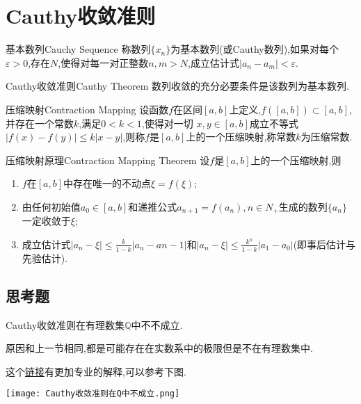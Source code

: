 \documentclass[cn,chinese,fontset]{elegantbook}
\begin{document}
    \section{Cauthy收敛准则}
        
        \begin{definition}{基本数列}{Cauchy Sequence}
            称数列$\{x_n\}$为基本数列(或Cauthy数列),如果对每个$\varepsilon>0$,存在$N$,使得对每一对正整数$n,m>N$,成立估计式$\lvert a_n-a_m\rvert<\varepsilon$.
        \end{definition}
        
        \begin{theorem}{Cauthy收敛准则}{Cauthy Theorem} 
            数列收敛的充分必要条件是该数列为基本数列.
        \end{theorem}
        
        \begin{definition}{压缩映射}{Contraction Mapping}
            设函数$f$在区间$[a,b]$上定义,$f([a,b])\subset [a,b]$,并存在一个常数$k$,满足$0<k<1$,使得对一切 $x,y\in [a,b]$成立不等式$\lvert f(x)-f(y)\rvert\leqslant k\lvert x-y\rvert$,则称$f$是$[a,b]$上的一个压缩映射,称常数$k$为压缩常数.
        \end{definition}
        \begin{theorem}{压缩映射原理}{Contraction Mapping Theorem}
            设$f$是$[a,b]$上的一个压缩映射,则
            \begin{enumerate}
                \item $f$在$[a,b]$中存在唯一的不动点$\xi=f(\xi)$;
                \item 由任何初始值$a_0\in[a,b]$和递推公式$a_{n+1}=f(a_n),n\in N_+$生成的数列$\{a_n\}$一定收敛于$\xi$;
                \item 成立估计式$\lvert a_n-\xi\rvert\leqslant\frac{k}{1-k}\lvert a_n-a{n-1}\rvert$和$\lvert a_n-\xi\rvert\leqslant\frac{k^n}{1-k}\lvert a_1-a_0\rvert$(即事后估计与先验估计).
            \end{enumerate}
        \end{theorem}
            \subsection{思考题}
            \begin{example}
                Cauthy收敛准则在有理数集$\mathbb{Q}$中不不成立.
            \end{example}
            \begin{solution}
                原因和上一节相同,都是可能存在在实数系中的极限但是不在有理数集中.

                这个\href{https://www.zhihu.com/question/50995932/answer/866173110}{链接}有更加专业的解释,可以参考下图.

                \texttt{[image: Cauthy收敛准则在Q中不成立.png]}
            \end{solution}
        
\end{document}
